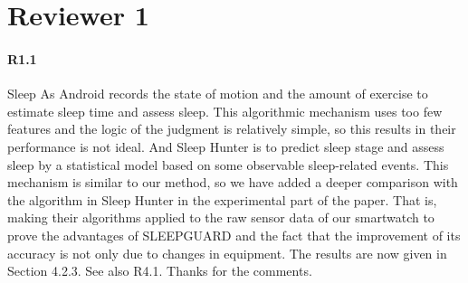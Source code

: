 \section*{Reviewer 1}
\vspace{-2mm}
\paragraph{R1.1} Sleep As Android records the state of motion and the amount of exercise to estimate sleep time and assess sleep. This algorithmic mechanism uses too few features and the logic of the judgment is relatively simple, so this results in their performance is not ideal. And Sleep Hunter is to predict sleep stage and assess sleep by a statistical model based on some observable sleep-related events. This mechanism is similar to our method, so we have added a deeper comparison with the algorithm in Sleep Hunter in the experimental part of the paper. That is, making their algorithms applied to the raw sensor data of our smartwatch to prove the advantages of SLEEPGUARD and the fact that the improvement of its accuracy is not only due to changes in equipment. The results are now given in Section 4.2.3. See also R4.1. Thanks for the comments.

